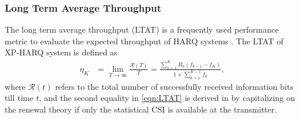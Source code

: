 \documentclass[lettersize,journal]{IEEEtran}
\begin{document}
\subsubsection{Long Term Average Throughput}
The long term average throughput (LTAT) is a frequently used performance metric to evaluate the expected throughput of HARQ systems \cite{Caire2001}. %
The LTAT of XP-HARQ system is defined as \cite{jabi2017adaptive}
\begin{equation}\label{eqn:LTAT}
    \begin{aligned}
    \eta_K
    &=\lim_{T\to \infty} \frac{\mathcal R(T)}{T} =\frac{\sum_{k=1}^K R_k\left(f_{k-1}-f_K\right)}{1+\sum_{k=1}^{K-1} f_k},
    \end{aligned}
\end{equation}
where ${\mathcal R(t)}$ refers to the total number of successfully received information bits till time $t$, and the second equality in \eqref{eqn:LTAT} is derived in \cite{Caire2001,jabi2017adaptive} by capitalizing on the renewal theory if only the statistical CSI is available at the transmitter. %
\end{document}
